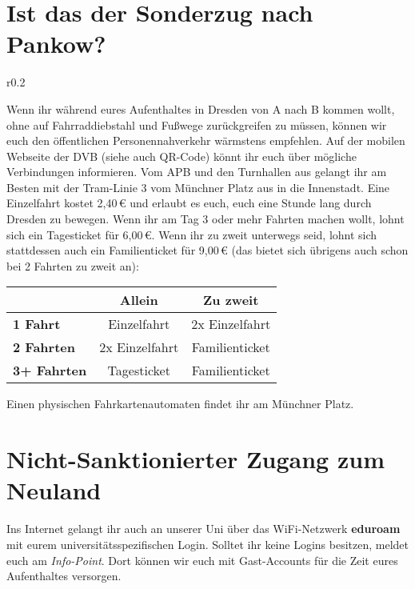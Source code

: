 \section*{Ist das der Sonderzug nach Pankow?}

\begin{wrapfigure}[6]{r}{0.2\textwidth}
  \vspace*{-11pt}
  \textcolor{KIFgrey}{}
\end{wrapfigure}

Wenn ihr während eures Aufenthaltes in Dresden von A nach B kommen wollt, ohne auf Fahrraddiebstahl und Fußwege zurückgreifen zu müssen, können wir euch den öffentlichen Personennahverkehr wärmstens empfehlen.
Auf der mobilen Webseite der DVB  (siehe auch QR-Code) könnt ihr euch über mögliche Verbindungen informieren.
Vom APB und den Turnhallen aus gelangt ihr am Besten mit der Tram-Linie 3 vom Münchner Platz aus in die Innenstadt.
Eine Einzelfahrt kostet 2,40\,€ und erlaubt es euch, euch eine Stunde lang durch Dresden zu bewegen. Wenn ihr am Tag 3 oder mehr Fahrten machen wollt, lohnt sich ein Tagesticket für 6,00\,€. Wenn ihr zu zweit unterwegs seid, lohnt sich stattdessen auch ein Familienticket für 9,00\,€ (das bietet sich übrigens auch schon bei 2 Fahrten zu zweit an):

\begin{center}
\begin{tabular}{l | c | c}
& \textbf{Allein} & \textbf{Zu zweit} \\ \hline
\textbf{1 Fahrt} & Einzelfahrt & 2x Einzelfahrt \\ \hline
\textbf{2 Fahrten} & 2x Einzelfahrt & Familienticket \\ \hline
\textbf{3+ Fahrten} & Tagesticket & Familienticket \\
\end{tabular}
\end{center}

Einen physischen Fahrkartenautomaten findet ihr am Münchner Platz.

\section*{Nicht-Sanktionierter Zugang zum Neuland}

Ins Internet gelangt ihr auch an unserer Uni über das WiFi-Netzwerk \textbf{eduroam} mit eurem universitätsspezifischen Login.
Solltet ihr keine Logins besitzen, meldet euch am \emph{Info-Point}.
Dort können wir euch mit Gast-Accounts für die Zeit eures Aufenthaltes versorgen.

